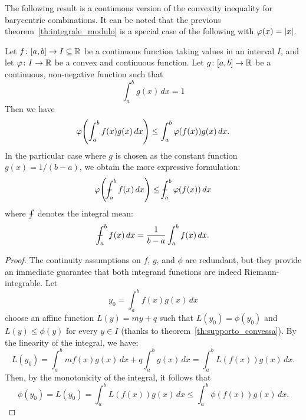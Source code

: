 The following result is a continuous version of the convexity inequality 
for barycentric combinations.
It can be noted that the previous theorem~\ref{th:integrale_modulo} is a special
case
of the following with $\varphi(x)={\left|x\right|}$.
%
\begin{theorem}
  \label{th:jensen}%
Let $f\colon[a,b]\to I\subseteq {\mathbb R}$ be a continuous function taking values 
in an interval $I$, and let $\varphi\colon I \to {\mathbb R}$ be a convex and continuous
function.
Let $g\colon [a,b]\to {\mathbb R}$ be a continuous,
non-negative function such that 
\[
    \int_a^b g(x)\, dx = 1
\]
Then we have 
  \[
  \varphi{\left( \int_a^b f(x) g(x) \, dx \right)} \le \int_a^b \varphi(f(x)) g(x)\, dx.
  \]
In the particular case where $g$ is chosen as the constant function
$g(x)=1/(b-a)$, we obtain
the more expressive formulation:
\[
  \phi\enclose{\dashint_a^b f(x)\, dx} \le \dashint_a^b \phi(f(x))\, dx
\]
where $\dashint$ denotes the integral mean:
\[
  \dashint_a^b f(x)\, dx = \frac{1}{b-a} \int_a^b f(x)\, dx.
\]
\end{theorem}
%
\begin{proof}
The continuity assumptions on $f$, $g$, and $\phi$ are redundant, but they
provide
an immediate guarantee that both integrand functions
are indeed Riemann-integrable.
Let 
\[
  y_0 = \int_a^b f(x) g(x)\, dx 
\]
choose an affine function $L(y) = my + q$ such that $L(y_0)=\phi(y_0)$ 
and $L(y)\le \phi(y)$ for every $y\in I$ (thanks to
theorem~\ref{th:supporto_convessa}).
By the linearity of the integral, we have: 
\[
  L(y_0)
  = \int_a^b mf(x)g(x)\, dx + q \int_a^b g(x)\, dx
  = \int_a^b L(f(x)) g(x)\, dx.
\]
Then, by the monotonicity of the integral, it follows that
\[
  \phi(y_0) = L(y_0) = \int_a^b L(f(x)) g(x)\, dx \le \int_a^b \phi(f(x)) g(x)\, dx.
\]
\end{proof}
    

